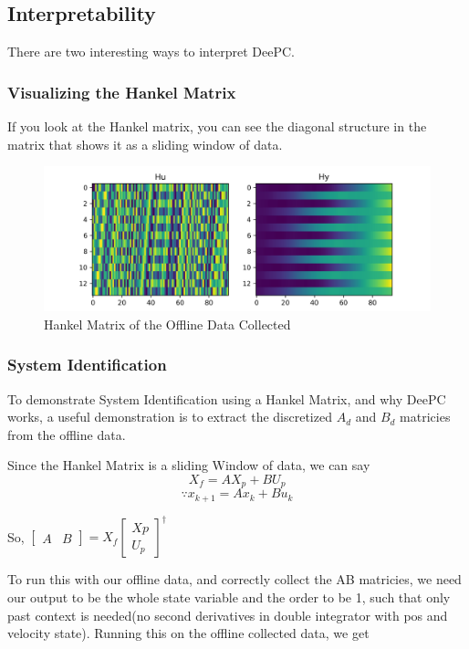 \documentclass[11pt,a4paper]{article}
\begin{document}
\subsection{Interpretability}

There are two interesting ways to interpret DeePC.
\subsubsection{Visualizing the Hankel Matrix}
If you look at the Hankel matrix, you can see the diagonal structure in the matrix that shows it as a sliding window of data.
\begin{figure}
	\centering
	\includegraphics[width=0.85\linewidth]{./figures/deePC_hankel_matrices_imshow.png}
	\caption{Hankel Matrix of the Offline Data Collected}
	\label{fig:hankel-matrix}
\end{figure}

\subsubsection{System Identification}


To demonstrate System Identification using a Hankel Matrix, and why DeePC works, a useful demonstration is to extract the discretized $A_d$ and $B_d$ matricies from the offline data.

Since the Hankel Matrix is a sliding Window of data, we can say
$$X_f=A X_p +B U_p$$
$$\because x_{k+1}=Ax_k+Bu_k$$

So, $
\begin{bmatrix}
    A & B
\end{bmatrix}=
X_f
\begin{bmatrix}
    Xp \\
    U_p
\end{bmatrix}^{\dagger}
$

To run this with our offline data, and correctly collect the AB matricies, we need our output to be the whole state variable and the order to be 1, such that only past context is needed(no second derivatives in double integrator with pos and velocity state). Running this on the offline collected data, we get
\end{document}

